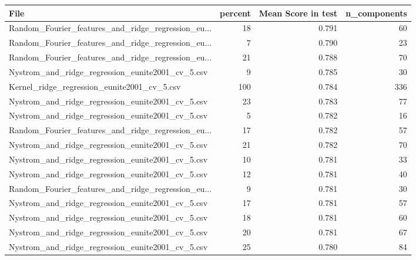 \begin{tabularx}{\textwidth}{lrrr}
\toprule
                                              File &  percent &  Mean Score in test &  n\_components \\
\midrule
Random\_Fourier\_features\_and\_ridge\_regression\_eu... &       18 &               0.791 &            60 \\
Random\_Fourier\_features\_and\_ridge\_regression\_eu... &        7 &               0.790 &            23 \\
Random\_Fourier\_features\_and\_ridge\_regression\_eu... &       21 &               0.788 &            70 \\
  Nystrom\_and\_ridge\_regression\_eunite2001\_cv\_5.csv &        9 &               0.785 &            30 \\
       Kernel\_ridge\_regression\_eunite2001\_cv\_5.csv &      100 &               0.784 &           336 \\
  Nystrom\_and\_ridge\_regression\_eunite2001\_cv\_5.csv &       23 &               0.783 &            77 \\
  Nystrom\_and\_ridge\_regression\_eunite2001\_cv\_5.csv &        5 &               0.782 &            16 \\
Random\_Fourier\_features\_and\_ridge\_regression\_eu... &       17 &               0.782 &            57 \\
  Nystrom\_and\_ridge\_regression\_eunite2001\_cv\_5.csv &       21 &               0.782 &            70 \\
  Nystrom\_and\_ridge\_regression\_eunite2001\_cv\_5.csv &       10 &               0.781 &            33 \\
  Nystrom\_and\_ridge\_regression\_eunite2001\_cv\_5.csv &       12 &               0.781 &            40 \\
Random\_Fourier\_features\_and\_ridge\_regression\_eu... &        9 &               0.781 &            30 \\
  Nystrom\_and\_ridge\_regression\_eunite2001\_cv\_5.csv &       17 &               0.781 &            57 \\
  Nystrom\_and\_ridge\_regression\_eunite2001\_cv\_5.csv &       18 &               0.781 &            60 \\
  Nystrom\_and\_ridge\_regression\_eunite2001\_cv\_5.csv &       20 &               0.781 &            67 \\
  Nystrom\_and\_ridge\_regression\_eunite2001\_cv\_5.csv &       25 &               0.780 &            84 \\

\end{tabularx}
